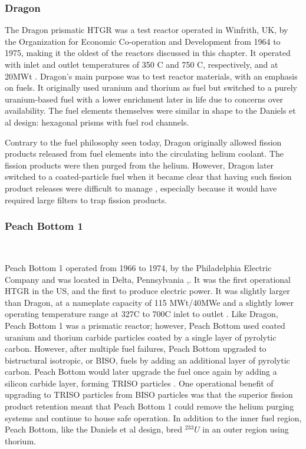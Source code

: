 \subsubsection{Dragon}
\label{dragon}

The Dragon prismatic HTGR was a test reactor operated in Winfrith, UK, by the Organization for Economic Co-operation and Development from 1964 to 1975, making it the oldest of the reactors discussed in this chapter.  It operated with inlet and outlet temperatures of 350 \textdegree C and 750 \textdegree C, respectively, and at 20MWt \cite{beck_high_nodate}.  Dragon's main purpose was to test reactor materials, with an emphasis on fuels.  It originally used uranium and thorium as fuel but switched to a purely uranium-based fuel with a lower enrichment later in life due to concerns over availability.  The fuel elements themselves were similar in shape to the Daniels et al design: hexagonal prisms with fuel rod channels.

Contrary to the fuel philosophy seen today, Dragon originally allowed fission products released from fuel elements into the circulating helium coolant.  The fission products were then purged from the helium.  However, Dragon later switched to a coated-particle fuel when it became clear that having such fission product releases were difficult to manage \cite{simnad_early_1991}, especially because it would have required large filters to trap fission products.

\subsubsection{Peach Bottom 1}\
\label{peach}

Peach Bottom 1 operated from 1966 to 1974, by the Philadelphia Electric Company and was located in Delta, Pennsylvania \cite{beck_high_nodate},\cite{noauthor_peach_nodate}.  It was the first operational HTGR in the US, and the first to produce electric power.  It was slightly larger than Dragon, at a nameplate capacity of 115 MWt/40MWe and a slightly lower operating temperature range at 327\textdegree  C to 700\textdegree  C inlet to outlet \cite{beck_high_nodate}.  Like Dragon, Peach Bottom 1 was a prismatic reactor; however, Peach Bottom used coated uranium and thorium carbide particles coated by a single layer of pyrolytic carbon.  However, after multiple fuel failures, Peach Bottom upgraded to bistructural isotropic, or BISO, fuels by adding an additional layer of pyrolytic carbon.  Peach Bottom would later upgrade the fuel once again by adding a silicon carbide layer, forming TRISO particles \cite{beck_high_nodate}.  One operational benefit of upgrading to TRISO particles from BISO particles was that the superior fission product retention meant that Peach Bottom 1 could remove the helium purging systems and continue to house safe operation.  In addition to the inner fuel region, Peach Bottom, like the Daniels et al design, bred $^{233}U$ in an outer region using thorium.

